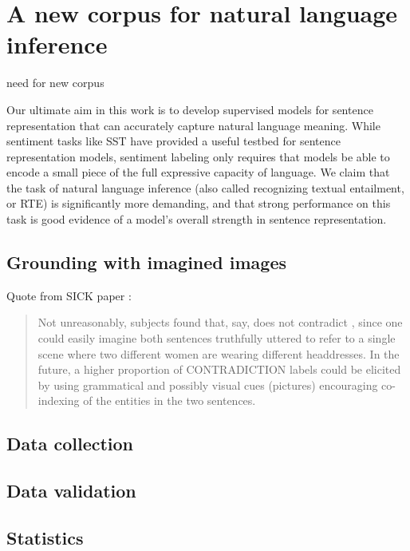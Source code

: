 \section{A new corpus for natural language inference}\label{sec:discussion}

need for new corpus

Our ultimate aim in this work is to develop supervised models for sentence representation that can accurately capture natural language meaning. While sentiment tasks like SST have provided a useful testbed for sentence representation models, sentiment labeling only requires that models be able to encode a small piece of the full expressive capacity of language. We claim that the task of natural language inference (also called recognizing textual entailment, or RTE) is significantly more demanding, and that strong performance on this task is good evidence of a model's overall strength in sentence representation.


\subsection{Grounding with imagined images}

Quote from SICK paper \cite{marelli2014sick}:

\begin{quote}
Not unreasonably, subjects found that, say,  does not contradict , since one could easily imagine both sentences truthfully uttered to refer to a single scene where two different women are wearing different headdresses. In the future, a higher proportion of CONTRADICTION labels could be elicited by using grammatical and possibly visual cues (pictures) encouraging co-indexing of the entities in the two sentences.
\end{quote}

\subsection{Data collection}

\subsection{Data validation}

\subsection{Statistics}

